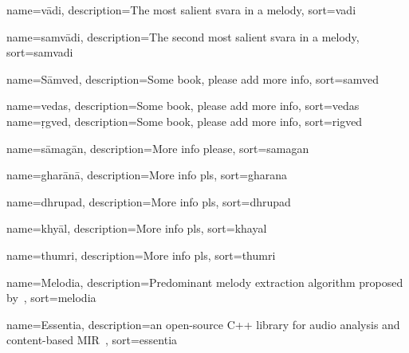 
	

	
	
{
	name={v\={a}di},
	description={The most salient svara in a melody},
	sort=vadi
}

{
	name={samv\={a}di},
	description={The second most salient svara in a melody},
	sort=samvadi
}

{
	name={S\={a}mved},
	description={Some book, please add more info},
	sort=samved
}

{
	name={vedas},
	description={Some book, please add more info},
	sort=vedas
}
{
	name={\d{r}gved},
	description={Some book, please add more info},
	sort=rigved
}

{
	name={s\={a}mag\={a}n},
	description={More info please},
	sort=samagan
}

{
	name={ghar\={a}n\={a}},
	description={More info pls},
	sort=gharana
}

{
	name={dhrupad},
	description={More info pls},
	sort=dhrupad
}

{
	name={khy\={a}l},
	description={More info pls},
	sort=khayal
}

{
	name={thumri},
	description={More info pls},
	sort=thumri
}

{
	name={Melodia},
	description={Predominant melody extraction algorithm proposed by~\cite{Salamon2012}},
	sort=melodia
}

{
	name={Essentia},
	description={an open-source C++ library for audio analysis and content-based MIR~\citep{essentia}},
	sort=essentia
}

